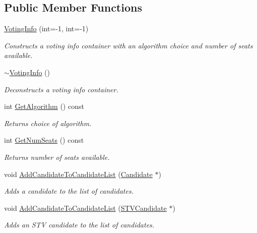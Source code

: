\subsection*{Public Member Functions}
\begin{DoxyCompactItemize}
\item 
\hyperlink{classVotingInfo_a7bdb2f2026f5f68eee3fbee92855b759}{Voting\+Info} (int=-\/1, int=-\/1)
\begin{DoxyCompactList}\small\item\em Constructs a voting info container with an algorithm choice and number of seats available. \end{DoxyCompactList}\item 
\mbox{\label{classVotingInfo_a72e88f41ab4e266582041b8f42768586}} 
\hyperlink{classVotingInfo_a72e88f41ab4e266582041b8f42768586}{$\sim$\+Voting\+Info} ()
\begin{DoxyCompactList}\small\item\em Deconstructs a voting info container. \end{DoxyCompactList}\item 
int \hyperlink{classVotingInfo_a2d0abd1d9be36bfd9fb734dfa644b8e1}{Get\+Algorithm} () const
\begin{DoxyCompactList}\small\item\em Returns choice of algorithm. \end{DoxyCompactList}\item 
int \hyperlink{classVotingInfo_a9c226e3b169e0228ab26cb0a251792bd}{Get\+Num\+Seats} () const
\begin{DoxyCompactList}\small\item\em Returns number of seats available. \end{DoxyCompactList}\item 
void \hyperlink{classVotingInfo_ac0ab5f83a06ea6721999addb43a581ea}{Add\+Candidate\+To\+Candidate\+List} (\hyperlink{classCandidate}{Candidate} $\ast$)
\begin{DoxyCompactList}\small\item\em Adds a candidate to the list of candidates. \end{DoxyCompactList}\item 
void \hyperlink{classVotingInfo_a18d8dfef16797ef988a296d5ef28c852}{Add\+Candidate\+To\+Candidate\+List} (\hyperlink{classSTVCandidate}{S\+T\+V\+Candidate} $\ast$)
\begin{DoxyCompactList}\small\item\em Adds an S\+TV candidate to the list of candidates. \end{DoxyCompactList}\item 

\end{DoxyCompactItemize}
